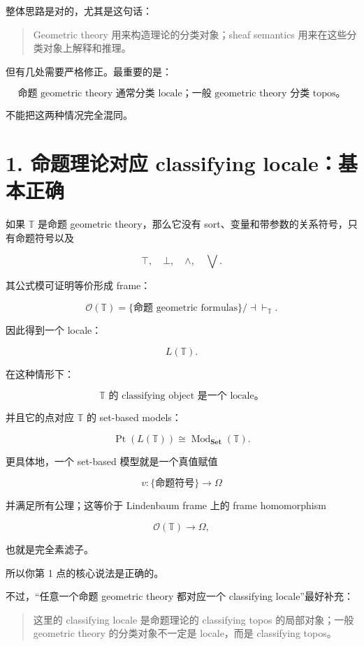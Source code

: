 \documentclass{ctexart}
\begin{document}
整体思路是对的，尤其是这句话：

\begin{quote}
Geometric theory 用来构造理论的分类对象；sheaf semantics 用来在这些分类对象上解释和推理。
\end{quote}

但有几处需要严格修正。最重要的是：

\[
\boxed{
\text{命题 geometric theory 通常分类 locale；一般 geometric theory 分类 topos。}
}
\]

不能把这两种情况完全混同。

\section*{1. 命题理论对应 classifying locale：基本正确}

如果 \(\mathbb T\) 是命题 geometric theory，那么它没有 sort、变量和带参数的关系符号，只有命题符号以及

\[
\top,\quad\bot,\quad\wedge,\quad\bigvee.
\]

其公式模可证明等价形成 frame：

\[
\mathcal O(\mathbb T)
=
\{\text{命题 geometric formulas}\}/\mathord{\dashv\vdash_{\mathbb T}}.
\]

因此得到一个 locale：

\[
L(\mathbb T).
\]

在这种情形下：

\[
\boxed{
\text{\(\mathbb T\) 的 classifying object 是一个 locale。}
}
\]

并且它的点对应 \(\mathbb T\) 的 set-based models：

\[
\operatorname{Pt}(L(\mathbb T))
\cong
\operatorname{Mod}_{\mathbf{Set}}(\mathbb T).
\]

更具体地，一个 set-based 模型就是一个真值赋值

\[
v:\{\text{命题符号}\}\to\Omega
\]

并满足所有公理；这等价于 Lindenbaum frame 上的 frame homomorphism

\[
\mathcal O(\mathbb T)\to\Omega,
\]

也就是完全素滤子。

所以你第 1 点的核心说法是正确的。

不过，``任意一个命题 geometric theory 都对应一个 classifying locale''最好补充：

\begin{quote}
这里的 classifying locale 是命题理论的 classifying topos 的局部对象；一般 geometric theory 的分类对象不一定是 locale，而是 classifying topos。
\end{quote}
\end{document}
